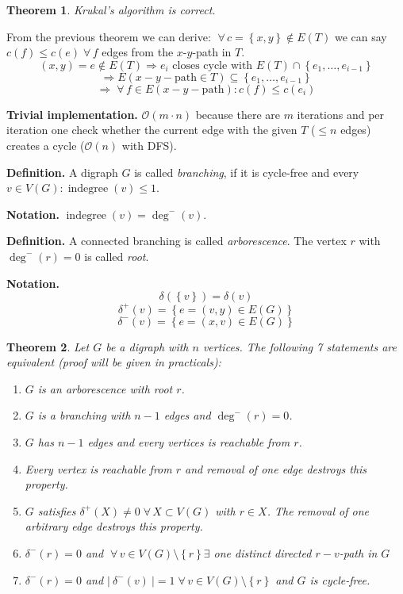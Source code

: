 \documentclass{article}
\newtheorem{theorem}{Theorem}
\newcommand{\card}[1]{\left|\:\!#1\:\!\right|}
\newcommand{\set}[1]{\left\{#1\right\}}
\newcommand{\gath}[2]{$#1$-$#2$-path} %
\newcommand{\fall}{\;\forall\,}
\begin{document}
\begin{theorem}\label{satz-2.3}
  Krukal's algorithm is correct.
\end{theorem}

From the previous theorem we can derive: $\fall c = \set{x, y} \notin E(T)$ we can say $c(f) \leq c(e) \fall f$ edges from the \gath xy in $T$.
\[
    (x, y) = e \notin E(T) \Rightarrow e_i \text{ closes cycle with } E(T) \cap \set{e_1, \ldots, e_{i-1}}
\] \[
    \Rightarrow E(x-y-\text{path} \in T) \subseteq \set{e_1, \ldots, e_{i-1}}
\] \[
    \Rightarrow \fall f \in E(x-y-\text{path}): c(f) \leq c(e_i)
\]

\textbf{Trivial implementation.}
  $\mathcal{O}(m\cdot n)$ because there are $m$ iterations and per iteration one check whether the current edge with the given $T$ ($\leq n$ edges) creates a cycle ($\mathcal{O}(n)$ with DFS).

\textbf{Definition.}
  A digraph $G$ is called \emph{branching}, if it is cycle-free and every $v \in V(G): \operatorname{indegree}(v) \leq 1$.

\textbf{Notation.}
  $\operatorname{indegree}(v) = \operatorname{deg}^-(v)$.

\textbf{Definition.}
  A connected branching is called \emph{arborescence}. The vertex $r$ with $\operatorname{deg}^-(r) = 0$ is called \emph{root}.

\textbf{Notation.}
  \[
    \delta(\set{v}) = \delta(v)
  \] \[
    \delta^+(v) = \set{e = (v, y) \in E(G)}
  \] \[
    \delta^-(v) = \set{e = (x, v) \in E(G)}
  \]

\begin{theorem}\label{satz-2.4}
  Let $G$ be a digraph with $n$ vertices. The following 7 statements are equivalent (proof will be given in practicals):
\begin{enumerate}
  \item $G$ is an arborescence with root $r$.
  \item $G$ is a branching with $n-1$ edges and $\operatorname{deg}^-(r) = 0$.
  \item $G$ has $n-1$ edges and every vertices is reachable from $r$.
  \item Every vertex is reachable from $r$ and removal of one edge destroys this property.
  \item $G$ satisfies $\delta^+(X) \neq 0 \fall X \subset V(G)$ with $r \in X$. The removal of one arbitrary edge destroys this property.
  \item $\delta^-(r) = 0$ and $\fall v \in V(G) \setminus \set{r} \exists$ one distinct directed $r-v$-path in $G$
  \item $\delta^-(r) = 0$ and $\card{\delta^-(v)} = 1 \fall v \in V(G) \setminus \set{r}$ and $G$ is cycle-free.
\end{enumerate}
\end{theorem}
\end{document}
